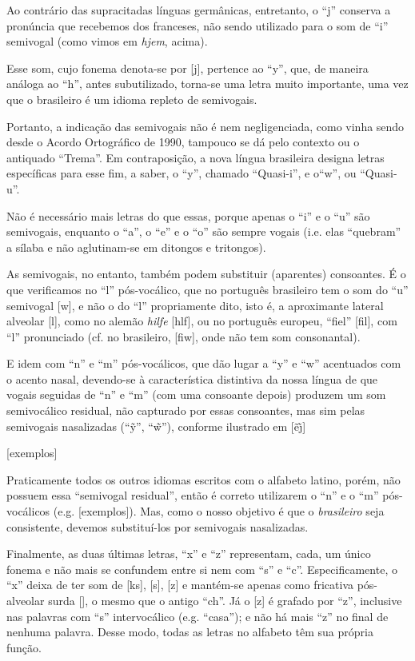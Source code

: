 \documentclass[12pt, a5paper, titlepage]{article}
\begin{document}
Ao contrário das supracitadas línguas germânicas, entretanto, o ``j'' conserva a pronúncia que recebemos dos franceses, não sendo utilizado para o som de ``i'' semivogal (como vimos em \textit{hjem}, acima).

Esse som, cujo fonema denota-se por [j], pertence ao ``y'', que, de maneira análoga ao ``h'', antes subutilizado, torna-se uma letra muito importante, uma vez que o brasileiro é um idioma repleto de semivogais.

Portanto, a indicação das semivogais não é nem negligenciada, como vinha sendo desde o Acordo Ortográfico de 1990, tampouco se dá pelo contexto ou o antiquado ``Trema''. Em contraposição, a nova língua brasileira designa letras específicas para esse fim, a saber, o ``y'', chamado ``Quasi-i'', e o``w'', ou ``Quasi-u''.

Não é necessário mais letras do que essas, porque apenas o ``i'' e o ``u'' são semivogais, enquanto o ``a'', o ``e'' e o ``o'' são sempre vogais (i.e. elas ``quebram'' a sílaba e não aglutinam-se em ditongos e tritongos).

As semivogais, no entanto, também podem substituir (aparentes) consoantes. É o que verificamos no ``l'' pós-vocálico, que no português brasileiro tem o som do ``u'' semivogal [w], e não o do ``l'' propriamente dito, isto é, a aproximante lateral alveolar [l], como no alemão \textit{hilfe} [\textprimstress h\textsci lf\textschwa], ou no português europeu, ``fiel'' [fi\textprimstress\textepsilon l], com ``l'' pronunciado (cf. no brasileiro, [fi\textprimstress \textepsilon w], onde não tem som consonantal).

E idem com ``n'' e ``m'' pós-vocálicos, que dão lugar a ``y'' e ``w'' acentuados com o acento nasal, devendo-se à característica distintiva da nossa língua de que vogais seguidas de ``n'' e ``m'' (com uma consoante depois) produzem um som semivocálico residual, não capturado por essas consoantes, mas sim pelas semivogais nasalizadas (``\~y'', ``\~w''), conforme ilustrado em [\~e\~\j]

[exemplos]

Praticamente todos os outros idiomas escritos com o alfabeto latino, porém, não possuem essa ``semivogal residual'', então é correto utilizarem o ``n'' e o ``m'' pós-vocálicos (e.g. [exemplos]). Mas, como o nosso objetivo é que o \textit{brasileiro} seja consistente, devemos substituí-los por semivogais nasalizadas.

Finalmente, as duas últimas letras, ``x'' e ``z'' representam, cada, um único fonema e não mais se confundem entre si nem com ``s'' e ``c''. Especificamente, o ``x'' deixa de ter som de [ks], [s], [z] e mantém-se apenas como fricativa pós-alveolar surda [\textesh], o mesmo que o antigo ``ch''. Já o [z] é grafado por ``z'', inclusive nas palavras com ``s'' intervocálico (e.g. ``casa''); e não há mais ``z'' no final de nenhuma palavra. Desse modo, todas as letras no alfabeto têm sua própria função.
\end{document}

